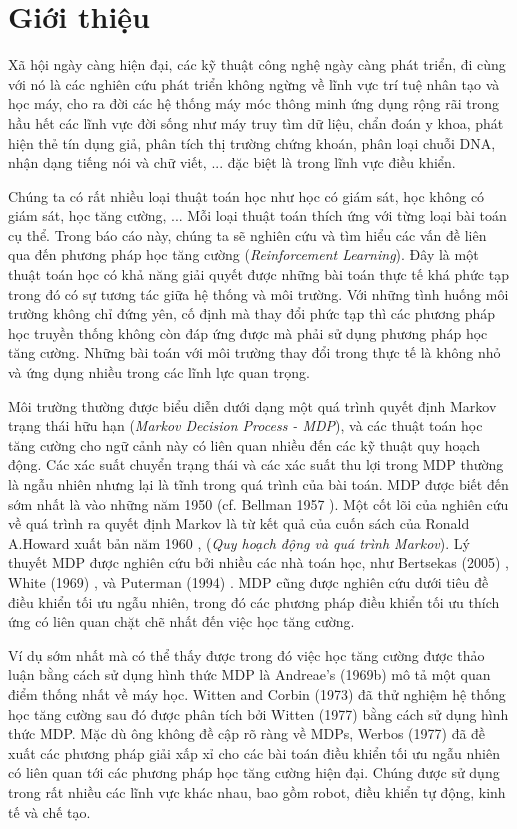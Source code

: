 \chapter{Giới thiệu}
\label{ch:intro}
	Xã hội ngày càng hiện đại, các kỹ thuật công nghệ ngày càng phát triển, đi cùng với nó là các nghiên cứu phát triển không ngừng về lĩnh vực trí tuệ nhân tạo và học máy, cho ra đời các hệ thống máy móc thông minh ứng dụng rộng rãi trong hầu hết các lĩnh vực đời sống như máy truy tìm dữ liệu, chẩn đoán y khoa, phát hiện thẻ tín dụng giả, phân tích thị trường chứng khoán, phân loại chuỗi DNA, nhận dạng tiếng nói và chữ viết, ... đặc biệt là trong lĩnh vực điều khiển.
	
	Chúng ta có rất nhiều loại thuật toán học như học có giám sát, học không có giám sát, học tăng cường, ... Mỗi loại thuật toán thích ứng với từng loại bài toán cụ thể. Trong báo cáo này, chúng ta sẽ nghiên cứu và tìm hiểu các vấn đề liên qua đến phương pháp học tăng cường (\textit{Reinforcement Learning}). Đây là một thuật toán học có khả năng giải quyết được những bài toán thực tế khá phức tạp trong đó có sự tương tác giữa hệ thống và môi trường. Với những tình huống môi trường không chỉ đứng yên, cố định mà thay đổi phức tạp thì các phương pháp học truyền thống không còn đáp ứng được mà phải sử dụng phương pháp học tăng cường. Những bài toán với môi trường thay đổi trong thực tế là không nhỏ và ứng dụng nhiều trong các lĩnh lực quan trọng.
	
	Môi trường thường được biểu diễn dưới dạng một quá trình quyết định Markov trạng thái hữu hạn (\textit{Markov Decision Process - MDP}), và các thuật toán học tăng cường cho ngữ cảnh này có liên quan nhiều đến các kỹ thuật quy hoạch động. Các xác suất chuyển trạng thái và các xác suất thu lợi trong MDP thường là ngẫu nhiên nhưng lại là tĩnh trong quá trình của bài toán. MDP được biết đến sớm nhất là vào những năm 1950 (cf. Bellman 1957 \cite{Belman1957}). Một cốt lõi của nghiên cứu về quá trình ra quyết định Markov là từ kết quả của cuốn sách của Ronald A.Howard xuất bản năm 1960  \cite{Howard1960}, (\textit{Quy hoạch động và quá trình Markov}). Lý thuyết MDP được nghiên cứu bởi nhiều các nhà toán học, như  Bertsekas (2005) \cite{Bertsekas2005} , White (1969) \cite{White1969}, và Puterman (1994) \cite{Puterman1994}. MDP cũng được nghiên cứu dưới tiêu đề điều khiển tối ưu ngẫu nhiên, trong đó các phương pháp điều khiển tối ưu thích ứng có liên quan chặt chẽ nhất đến việc học tăng cường.
	
		Ví dụ sớm nhất mà có thể thấy được trong đó việc học tăng cường được thảo luận bằng cách sử dụng hình thức MDP là Andreae’s (1969b) \cite{Andreae1969b} mô tả một quan điểm thống nhất về máy học. Witten and Corbin (1973) \cite{Witten1973} đã thử nghiệm hệ thống học tăng cường sau đó được phân tích bởi Witten (1977) \cite{Witten1977} bằng cách sử dụng hình thức MDP. Mặc dù ông không đề cập rõ ràng về MDPs, Werbos (1977) \cite{Werbos1977} đã đề xuất các phương pháp giải xấp xỉ cho các bài toán điều khiển tối ưu ngẫu nhiên có liên quan tới các phương pháp học tăng cường hiện đại. Chúng được sử dụng trong rất nhiều các lĩnh vực khác nhau, bao gồm robot, điều khiển tự động, kinh tế và chế tạo.\\
	
